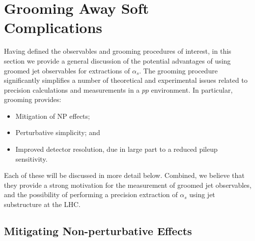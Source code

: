 \documentclass[11pt]{cernrep}
\begin{document}
\section{Grooming Away Soft Complications}
\label{jetsub_alphas_sec:softcomplications}

Having defined the observables and grooming procedures of interest, in this section we provide a general discussion of the potential advantages of using groomed jet observables for extractions of $\alpha_s$.
%
The grooming procedure significantly simplifies a number of theoretical and experimental issues related to precision calculations and measurements in a $pp$ environment.
%
In particular, grooming provides:
%
\begin{itemize}
\item Mitigation of NP effects;
\item Perturbative simplicity; and
\item Improved detector resolution, due in large part to a reduced pileup sensitivity.
\end{itemize}
%
Each of these will be discussed in more detail below.
%
Combined, we believe that they provide a strong motivation for the measurement of  groomed jet observables, and the possibility of performing a precision extraction of $\alpha_s$ using jet substructure at the LHC.

\subsection{Mitigating Non-perturbative Effects}
\end{document}
